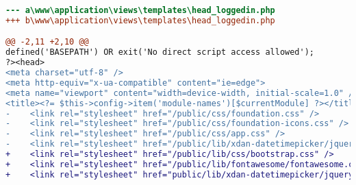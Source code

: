 \begin{lstlisting}[language=diff, caption=Perubahan file \path{\views\templates\head_loggedin.php},  basicstyle=\ttfamily, frame=single,
columns=fullflexible, keepspaces=true, breaklines=true, label={lst:headloggedin}]
--- a\www\application\views\templates\head_loggedin.php
+++ b\www\application\views\templates\head_loggedin.php

@@ -2,11 +2,10 @@
defined('BASEPATH') OR exit('No direct script access allowed');
?><head>
<meta charset="utf-8" />
<meta http-equiv="x-ua-compatible" content="ie=edge">
<meta name="viewport" content="width=device-width, initial-scale=1.0" />
<title><?= $this->config->item('module-names')[$currentModule] ?></title>
-    <link rel="stylesheet" href="/public/css/foundation.css" />
-    <link rel="stylesheet" href="/public/css/foundation-icons.css" />
-    <link rel="stylesheet" href="/public/css/app.css" />
-    <link rel="stylesheet" href="/public/lib/xdan-datetimepicker/jquery.datetimepicker.min.css" />
+    <link rel="stylesheet" href="/public/lib/css/bootstrap.css" />
+    <link rel="stylesheet" href="/public/lib/fontawesome/fontawesome.css">
+    <link rel="stylesheet" href="public/lib/xdan-datetimepicker/jquery.datetimepicker.min.css">
\end{lstlisting}

